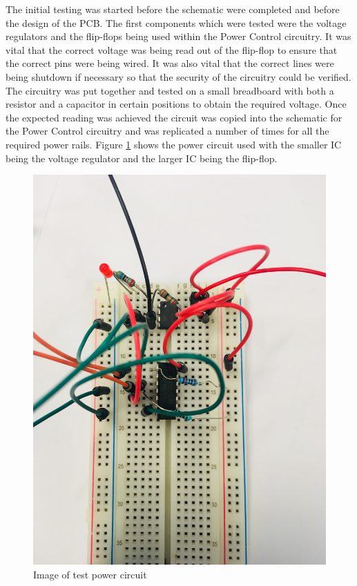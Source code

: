 The initial testing was started before the schematic were completed and before the design of the PCB. The first components which were tested were the voltage regulators and the flip-flops being used within the Power Control circuitry. It was vital that the correct voltage was being read out of the flip-flop to ensure that the correct pins were being wired. It was also vital that the correct lines were being shutdown if necessary so that the security of the circuitry could be verified. The circuitry was put together and tested on a small breadboard with both a resistor and a capacitor in certain positions to obtain the required voltage. Once the expected reading was achieved the circuit was copied into the schematic for the Power Control circuitry and was replicated a number of times for all the required power rails. Figure \ref{fig:power_circuit} shows the power circuit used with the smaller IC being the voltage regulator and the larger IC being the flip-flop.

\begin{figure}
	\includegraphics[width=0.5\linewidth]{powercircuit.jpg}\centering
	\caption{Image of test power circuit}
	\label{fig:power_circuit}
\end{figure}




